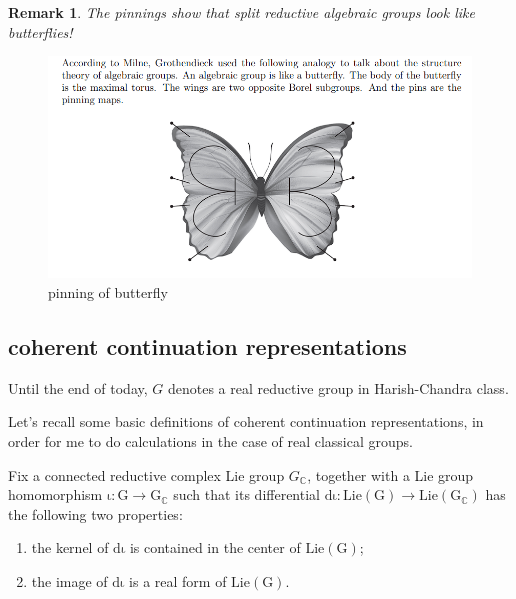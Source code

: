 \documentclass[12pt]{amsart}
\numberwithin{equation}{section}
\newtheorem{rk}[thm]{Remark}
\newcommand{\BC}{{\mathbb {C}}}
\begin{document}
\begin{rk}
  The pinnings show that split reductive algebraic groups look like butterflies!
\end{rk}

\begin{figure}[H]
  \centering
  \includegraphics[width=1.0\linewidth]{3.png}
  \caption{pinning of butterfly}
\end{figure}

\newpage

\subsection{coherent continuation representations}

Until the end of today, $G$ denotes a real reductive group in Harish-Chandra class.

Let's recall some basic definitions of coherent continuation representations, in order
for me to do calculations in the case of real classical groups.


Fix a connected reductive complex Lie group $G_\BC$, together with a Lie group homomorphism
$\mathrm{\iota: G \to  G_\BC}$ such that its differential $\mathrm{d\iota} : \mathrm{Lie(G)} \to \mathrm{Lie(G_\BC)}$
has the following two properties:
\begin{enumerate}
  \item the kernel of $\mathrm{d\iota}$ is contained in the center of $\mathrm{Lie(G)}$;
  \item the image of $\mathrm{d\iota}$ is a real form of $\mathrm{Lie(G)}$.
\end{enumerate}
\end{document}
